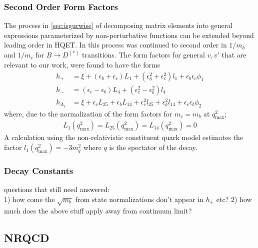 \subsubsection{Second Order Form Factors}

The process in \ref{sec:isgurwise} of decomposing matrix elements into general expressions parameterized by non-perturbative functions can be extended beyond leading order in HQET. In \cite{Falk:1992wt} this process was continued to second order in $1/m_b$ and $1/m_c$ for $B\to D^{(*)}$ transitions. The form factors for general $v,v'$ that are relevant to our work, were found to have the forms
\begin{align}
	h_+ &= \xi + (\epsilon_b + \epsilon_c ) L_1 + ( \epsilon_b^2 + \epsilon_c^2 ) l_1 + \epsilon_b \epsilon_c \phi_1 \\
	h_- &= ( \epsilon_c - \epsilon_b )L_4 + (\epsilon_c^2-\epsilon_b^2) l_4\\
	h_{A_1} &= \xi + \epsilon_c  L_{25} + \epsilon_b L_{14} + \epsilon_c^2 l_{25} + \epsilon_b^2 l_{14} + \epsilon_c\epsilon_b \phi_2
\end{align}
where, due to the normalization of the form factors for $m_c=m_b$ at $q^2_{\text{max}}$;
\begin{align}
L_1(q^2_{\text{max}}) = L_{25}(q^2_{\text{max}}) = L_{14}(q^2_{\text{max}}) = 0
\end{align}
A calculation using the non-relativistic constituent quark model \cite{PhysRevD.39.799} estimates the factor $l_1(q^2_{\text{max}}) = -3m_q^2$ where $q$ is the spectator of the decay.

\subsubsection{Decay Constants}

{\color{red}questions that still need answered: \\ 
1) how come the $\sqrt{m_b}$ from state normalizations don't appear in $h_+$ etc?
2) how much does the above stuff apply away from continuum limit? }

\subsection{NRQCD}

{}

